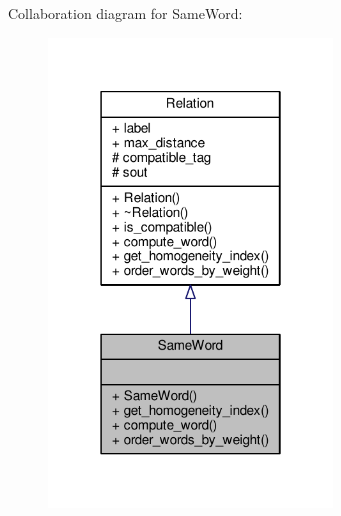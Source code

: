 Collaboration diagram for Same\+Word\+:
\nopagebreak
\begin{figure}[H]
\begin{center}
\leavevmode
\includegraphics[width=214pt]{classSameWord__coll__graph}
\end{center}
\end{figure}
